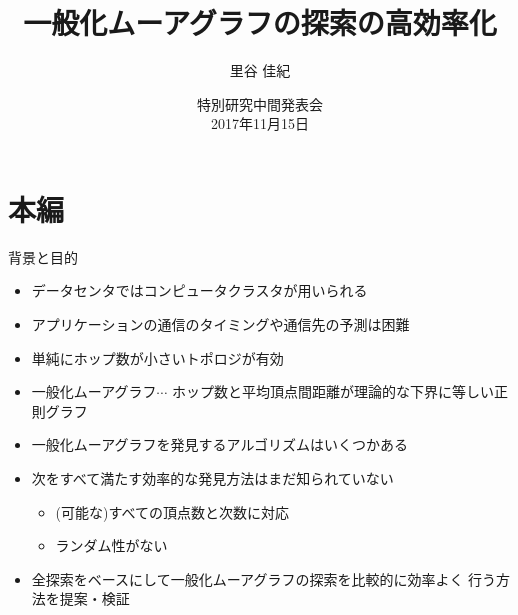 \documentclass[dvipdfmx]{beamer}
\title{一般化ムーアグラフの探索の高効率化}
\author{里谷 佳紀}
\institute{高橋研究室}
\date[特別研究中間発表会]{特別研究中間発表会 \\ 2017年11月15日}
\theoremstyle{definition}
\begin{document}
\begin{frame}
  \maketitle
\end{frame}

\section{本編}
\begin{frame}{背景と目的}
  \begin{itemize}
  \item データセンタではコンピュータクラスタが用いられる
  \item アプリケーションの通信のタイミングや通信先の予測は困難
  \item 単純にホップ数が小さいトポロジが有効\cite{Koibuchi2012, Singla2011}
  \item \alert{一般化ムーアグラフ}$\cdots$
    ホップ数と平均頂点間距離が理論的な下界に等しい正則グラフ
    \cite{cerf1973computer, Cerf1974}
  \item 一般化ムーアグラフを発見するアルゴリズムはいくつかある
    \cite{Sampels2004, Fujita2015, Yamamoto2016}
  \item 次をすべて満たす効率的な発見方法はまだ知られていない
    \begin{itemize}
    \item (可能な)すべての頂点数と次数に対応
    \item ランダム性がない
    \end{itemize}
  \item 全探索をベースにして一般化ムーアグラフの探索を比較的に効率よく
    行う方法を提案・検証
  \end{itemize}
\end{frame}
\end{document}

